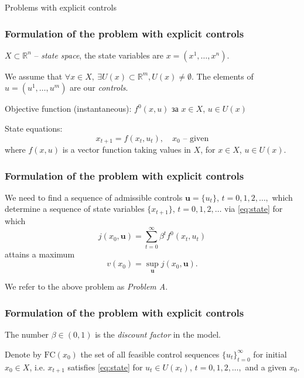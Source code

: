 \documentclass[10pt]{beamer}
\theoremstyle{definition}
\begin{document}
\begin{section}{Problems with explicit controls}\label{sec:explcontr}

\begin{frame}[fragile]
\frametitle{Formulation of the problem with explicit controls}
$X \subset \mathbb{R}^n$  -- \emph{state space}, the state variables are $x=(x^1,\ldots,x^n)$. \bigskip

We assume that $\forall x \in X,~ \exists U(x) \subset \mathbb{R}^m, U(x)\neq \emptyset$. The elements of $u=(u^1,\ldots,u^m)$ are our \emph{controls}. \bigskip

Objective function (instantaneous): $f^0(x,u)$ за $x \in X$, $u \in U(x)$ \bigskip

State equations:
\begin{equation}
x_{t+1}=f(x_t,u_t),\quad x_0 \text{ -- given} \label{eq:state}
\end{equation}
where $f(x,u)$ is a vector function taking values in $X$, for $x \in X$, $u \in U(x)$.\bigskip
\end{frame}



\begin{frame}[fragile]
\frametitle{Formulation of the problem with explicit controls}

We need to find a sequence of admissible controls $\mathbf{u} = \{u_t\}$, $t=0,1,2,\ldots,$
which determine a sequence of state variables $\{ x_{t+1} \}$, $t=0,1,2,\ldots$ via \eqref{eq:state} for which \begin{equation}
j(x_0,\mathbf{u})=\sum_{t=0}^\infty
\beta^t f^0(x_t,u_t)\label{eq:obj}
\end{equation} attains a maximum \begin{equation}
v(x_0)=\sup_{\mathbf{u}} j(x_0,\mathbf{u}).  
\label{eq:objMax}
\end{equation} 

We refer to the above problem as \emph{Problem A}.
\end{frame}



\begin{frame}[fragile]
\frametitle{Formulation of the problem with explicit controls}
The number $\beta \in (0,1)$ is the \emph{discount factor} in the model. \bigskip

Denote by $\textrm{FC}(x_0)$ the set of all feasible control sequences $\{ u_t\}_{t=0}^\infty$ for initial $x_0 \in X$, i.e. $ x_{t+1} $
satisfies \eqref{eq:state} for $ u_t \in U(x_t)$, $t=0,1,2,\ldots,$
and a given $x_0$. \bigskip


\end{frame}
\end{section}
\end{document}
